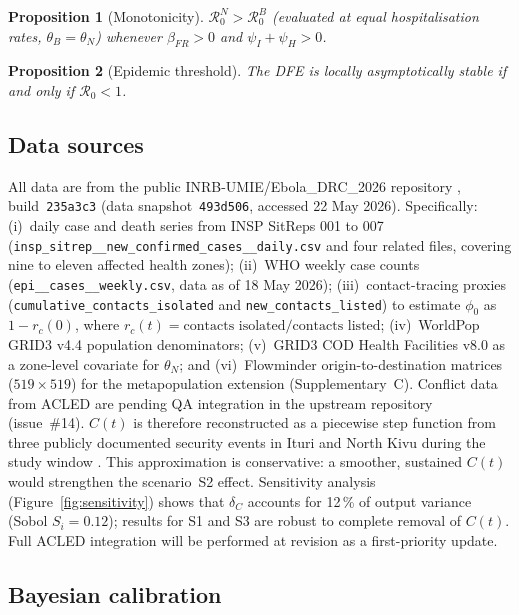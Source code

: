 \documentclass[12pt,a4paper]{article}
\newtheorem{proposition}{Proposition}
\begin{document}
\begin{proposition}[Monotonicity]
$\mathcal{R}_0^N > \mathcal{R}_0^B$ (evaluated at equal hospitalisation rates, $\theta_B = \theta_N$) whenever
$\beta_{FR} > 0$ and $\psi_I + \psi_H > 0$.
\end{proposition}

\begin{proposition}[Epidemic threshold]
The DFE is locally asymptotically stable if and only if $\mathcal{R}_0 < 1$.
\end{proposition}

\subsection{Data sources}

All data are from the public INRB-UMIE/Ebola\_DRC\_2026 repository
\citep{INRB2026}, build~\texttt{235a3c3} (data snapshot~\texttt{493d506},
accessed 22 May 2026). Specifically: (i)~daily case and death series from
INSP SitReps 001 to 007
(\texttt{insp\_sitrep\_\_new\_confirmed\_cases\_\_daily.csv}
and four related files, covering nine to eleven affected health zones);
(ii)~WHO weekly case counts (\texttt{epi\_\_cases\_\_weekly.csv}, data as of
18 May 2026); (iii)~contact-tracing proxies
(\texttt{cumulative\_contacts\_isolated} and \texttt{new\_contacts\_listed})
to estimate $\phi_0$ as $1 - r_c(0)$, where $r_c(t) = \text{contacts
isolated}/\text{contacts listed}$; (iv)~WorldPop GRID3 v4.4 population
denominators; (v)~GRID3 COD Health Facilities v8.0 as a zone-level covariate
for $\theta_N$; and (vi)~Flowminder origin-to-destination matrices
($519{\times}519$) for the metapopulation extension (Supplementary~C).
Conflict data from ACLED are pending QA integration in the upstream
repository (issue~\#14). $C(t)$ is therefore reconstructed as a
piecewise step function from three publicly documented security events
in Ituri and North Kivu during the study window
\citep{Gayer2007,Euronews2026,NPR2026}. This approximation
is conservative: a smoother, sustained $C(t)$ would strengthen the
scenario~S2 effect. Sensitivity analysis (Figure~\ref{fig:sensitivity})
shows that $\delta_C$ accounts for 12\,\% of output variance
(Sobol $S_i = 0.12$); results for S1 and S3 are robust to complete
removal of $C(t)$. Full ACLED integration will be performed at revision
as a first-priority update.

\subsection{Bayesian calibration}
\end{document}
